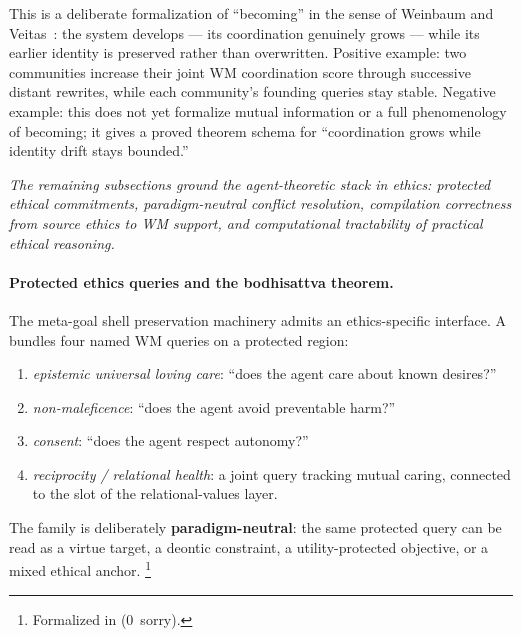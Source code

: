 \documentclass[11pt,openany]{report}
\begin{document}
\noindent
This is a deliberate formalization of ``becoming'' in the sense of
Weinbaum and Veitas~\cite{WeinbaumVeitas2015}: the system develops
--- its coordination genuinely grows --- while its earlier identity is
preserved rather than overwritten.
Positive example: two communities increase their joint WM coordination score
through successive distant rewrites, while each community's founding queries
stay stable.
Negative example: this does not yet formalize mutual information or a full
phenomenology of becoming; it gives a proved theorem schema for
``coordination grows while identity drift stays bounded.''

\bigskip
\noindent\textit{The remaining subsections ground the agent-theoretic stack
  in ethics: protected ethical commitments, paradigm-neutral conflict
  resolution, compilation correctness from source ethics to WM support, and
  computational tractability of practical ethical reasoning.}
\bigskip

\paragraph{Protected ethics queries and the bodhisattva theorem.}

The meta-goal shell preservation machinery admits an ethics-specific
interface.  A  bundles four named WM
queries on a protected region:
\begin{enumerate}
\item \emph{epistemic universal loving care}: ``does the agent care about
  known desires?''
\item \emph{non-maleficence}: ``does the agent avoid preventable harm?''
\item \emph{consent}: ``does the agent respect autonomy?''
\item \emph{reciprocity / relational health}: a joint query tracking mutual
  caring, connected to the  slot of the relational-values
  layer.
\end{enumerate}
\noindent
The family is deliberately \textbf{paradigm-neutral}: the same protected
query can be read as a virtue target, a deontic constraint, a
utility-protected objective, or a mixed ethical anchor.%
\footnote{Formalized in
(0~sorry).}
\end{document}
